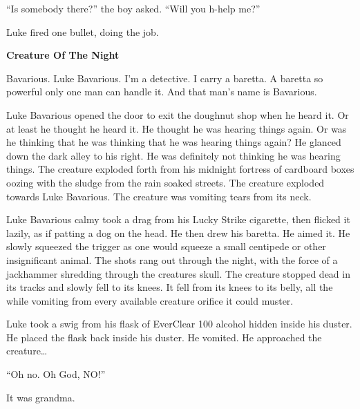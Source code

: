 ``Is somebody there?'' the boy asked. ``Will you
h-help me?''



Luke fired one bullet, doing the job. 

 





{\bf Creature Of The Night}





Bavarious. Luke Bavarious. I'm a detective. I carry a baretta. A
baretta so powerful only one man can handle it. And that man's name
is Bavarious.



Luke Bavarious opened the door to exit the doughnut shop when he
heard it. Or at least he thought he heard it. He thought he was
hearing things again. Or was he thinking that he was thinking that
he was hearing things again? He glanced down the dark alley to his
right. He was definitely not thinking he was hearing things. The
creature exploded forth from his midnight fortress of cardboard
boxes oozing with the sludge from the rain soaked streets. The
creature exploded towards Luke Bavarious. The creature was vomiting
tears from its neck.



Luke Bavarious calmy took a drag from his Lucky Strike cigarette,
then flicked it lazily, as if patting a dog on the head. He then
drew his baretta. He aimed it. He slowly squeezed the trigger as
one would squeeze a small centipede or other insignificant animal.
The shots rang out through the night, with the force of a
jackhammer shredding through the creatures skull. The creature
stopped dead in its tracks and slowly fell to its knees. It fell
from its knees to its belly, all the while vomiting from every
available creature orifice it could muster.



Luke took a swig from his flask of EverClear 100%
alcohol hidden inside his duster. He placed the flask back inside
his duster. He vomited. He approached the creature{\ldots}



``Oh no. Oh God, NO!''



It was grandma. 
 





